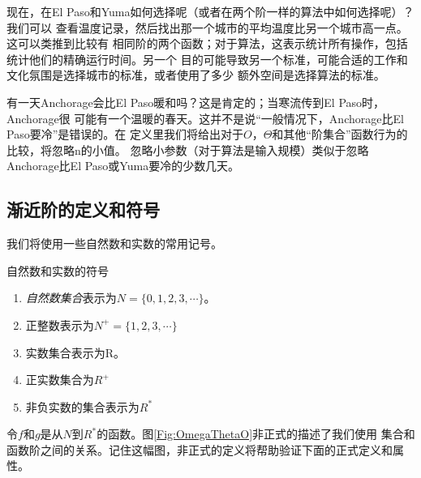 现在，在El Paso和Yuma如何选择呢（或者在两个阶一样的算法中如何选择呢）？我们可以
查看温度记录，然后找出那一个城市的平均温度比另一个城市高一点。这可以类推到比较有
相同阶的两个函数；对于算法，这表示统计所有操作，包括统计他们的精确运行时间。另一个
目的可能导致另一个标准，可能合适的工作和文化氛围是选择城市的标准，或者使用了多少
额外空间是选择算法的标准。

有一天Anchorage会比El Paso暖和吗？这是肯定的；当寒流传到El Paso时，
Anchorage很
可能有一个温暖的春天。这并不是说“一般情况下，Anchorage比El Paso要冷”是错误的。在
定义里我们将给出对于$O$，$\Theta$和其他“阶集合”函数行为的比较，将忽略n的小值。
忽略小参数（对于算法是输入规模）类似于忽略Anchorage比El Paso或Yuma要冷的少数几天。

\subsection{渐近阶的定义和符号}\label{Sec:AsymptoticOrderDefinitionAndSymbols}
我们将使用一些自然数和实数的常用记号。
\begin{definition}
自然数和实数的符号
\begin{enumerate}
    \item \emph{自然数集合}表示为$N=\{0, 1, 2, 3, \cdots\}$。
    \item 正整数表示为$N^+=\{1, 2, 3, \cdots\}$
    \item 实数集合表示为R。
    \item 正实数集合为$R^+$
    \item 非负实数的集合表示为$R^*$
\end{enumerate}
\end{definition}

\begin{figure*}[!t]
    \centering
    \caption{$\Omega$, $\Theta$, $O$}
    \label{Fig:OmegaThetaO}
\end{figure*}

令$f$和$g$是从$N$到$R^*$的函数。图\ref{Fig:OmegaThetaO}非正式的描述了我们使用
集合和函数阶之间的关系。记住这幅图，非正式的定义将帮助验证下面的正式定义和属性。


